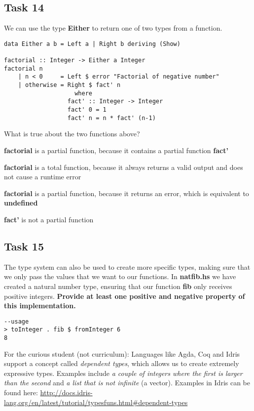 \documentclass{article}
\begin{document}
\subsection*{Task 14}
We can use the type \textbf{Either} to return one of two types from a function.
\lstset{mathescape=false}
\begin{lstlisting}
data Either a b = Left a | Right b deriving (Show)

factorial :: Integer -> Either a Integer
factorial n
    | n < 0     = Left $ error "Factorial of negative number"
    | otherwise = Right $ fact' n
                    where
                  fact' :: Integer -> Integer 
                  fact' 0 = 1
                  fact' n = n * fact' (n-1)
\end{lstlisting}
What is true about the two functions above?
\begin{deloppgaver}
    \item \textbf{factorial} is a partial function, because it contains a partial function \textbf{fact'}
    \item \textbf{factorial} is a total function, because it always returns a valid output and does not cause a runtime error
    \item \textbf{factorial} is a partial function, because it returns an error, which is equivalent to \textbf{undefined}
    \item \textbf{fact'} is not a partial function
\end{deloppgaver}

\subsection*{Task 15}
The type system can also be used to create more specific types, making sure that we only pass the values that we want to our functions. In \textbf{natfib.hs} we have created a natural number type, ensuring that our function \textbf{fib} only receives positive integers. \textbf{Provide at least one positive and negative property of this implementation.}\\
\begin{lstlisting}
--usage
> toInteger . fib $ fromInteger 6
8
\end{lstlisting}

For the curious student (not curriculum): Languages like Agda, Coq and Idris support a concept called \textit{dependent types}, which allows us to create extremely expressive types. Examples include \textit{a couple of integers where the first is larger than the second} and \textit{a list that is not infinite} (a vector). Examples in Idris can be found here: \url{http://docs.idris-lang.org/en/latest/tutorial/typesfuns.html#dependent-types}
\end{document}
